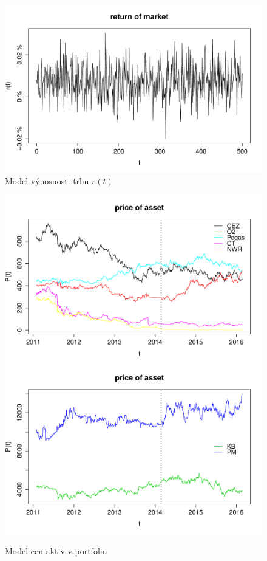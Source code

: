 \documentclass[a4paper,12pt]{report}
\theoremstyle{definition} \newtheorem{definice}[veta]{Definice}
\theoremstyle{remark}
\begin{document}
\begin{figure}[!htbp]
  \centering 
	\includegraphics[width=13.5cm, clip, trim= 0 15 25 50]{IMG/return_of_market_v4b.pdf}
  \caption{Model výnosnosti trhu $r(t)$}  \label{return_of_market}
\end{figure}

\begin{figure}[!htbp]
  \centering 
	\includegraphics[width=13.5cm, clip, trim= 0 15 25 50]{IMG/ds_price_of_asset_ostatni.pdf}\\[5mm]
	\includegraphics[width=13.5cm, clip, trim= 0 15 25 50]{IMG/ds_price_of_asset_KBPM_v2.pdf}	
  \caption{Model cen aktiv v portfoliu}  \label{price_of_asset}
\end{figure}
\end{document}
